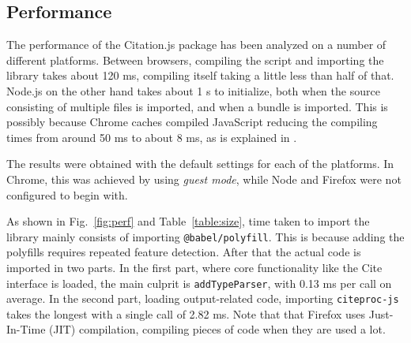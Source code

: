 \documentclass[fleqn,10pt,lineno]{wlpeerj} %
\begin{document}
\subsection*{Performance}

The performance of the Citation.js package has been analyzed on a number of different platforms. Between browsers, compiling the script and importing the library takes about 120 ms, compiling itself taking a little less than half of that. Node.js on the other hand takes about 1 s to initialize, both when the source consisting of multiple files is imported, and when a bundle is imported. This is possibly because Chrome caches compiled JavaScript reducing the compiling times from around 50 ms to about 8 ms, as is explained in \cite{alle_improved_2018}.

The results were obtained with the default settings for each of the platforms. In Chrome, this was achieved by using \emph{guest mode}, while Node and Firefox were not configured to begin with.

As shown in Fig.~\ref{fig:perf} and Table~\ref{table:size}, time taken to import the library mainly consists of importing \texttt{@babel/polyfill}. This is because adding the polyfills requires repeated feature detection. After that the actual code is imported in two parts. In the first part, where core functionality like the Cite interface is loaded, the main culprit is \texttt{addTypeParser}, with 0.13 ms per call on average. In the second part, loading output-related code, importing \texttt{citeproc-js} takes the longest with a single call of 2.82 ms.
Note that that Firefox uses Just-In-Time (JIT) compilation, compiling pieces of code when they are used a lot.
\end{document}
